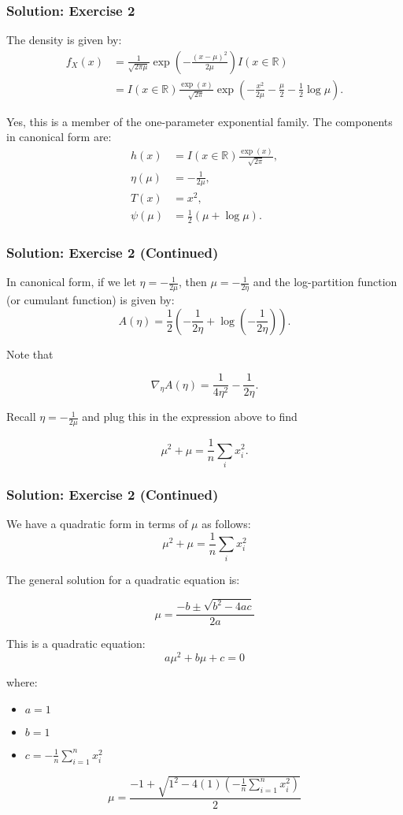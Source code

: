 \documentclass{beamer}
\begin{document}
\begin{frame}
\frametitle{Solution: Exercise 2}
The density is given by:
\[
\begin{aligned}
f_X(x) &= \frac{1}{\sqrt{2\pi\mu}} \exp\left(-\frac{(x - \mu)^2}{2\mu} \right) I(x \in \mathbb{R})\\[1mm]
&= I(x \in \mathbb{R}) \frac{\exp(x)}{\sqrt{2\pi}} \exp\left(-\frac{x^2}{2\mu} - \frac{\mu}{2} - \frac{1}{2}\log \mu \right).
\end{aligned}
\]

Yes, this is a member of the one-parameter exponential family. The components in canonical form are:
\[
\begin{aligned}
h(x) &= I(x \in \mathbb{R})\frac{\exp(x)}{\sqrt{2\pi}},\\[1mm]
\eta(\mu) &= -\frac{1}{2\mu},\\[1mm]
T(x) &= x^2,\\[1mm]
\psi(\mu) &= \frac{1}{2}\left(\mu + \log \mu\right).
\end{aligned}
\]

\end{frame}

\begin{frame}
\frametitle{Solution: Exercise 2 (Continued)}
In canonical form, if we let \(\eta = -\frac{1}{2\mu}\), then \(\mu = -\frac{1}{2\eta}\) and the log-partition function (or cumulant function) is given by:
\[
A(\eta) = \frac{1}{2}\left(-\frac{1}{2\eta} + \log\left(-\frac{1}{2\eta}\right)\right).
\]

Note that 

$$
\nabla_{\eta} A(\eta) = \frac{1}{4 \eta^2} - \frac{1}{2 \eta}.
$$

Recall \(\eta = -\frac{1}{2\mu}\) and plug this in the expression above to find

$$\mu^2 + \mu = \frac{1}{n} \sum_i x_i^2.$$

\end{frame}

\begin{frame}
\frametitle{Solution: Exercise 2 (Continued)}

We have a quadratic form in terms of $\mu$ as follows:
$$\mu^2 + \mu = \frac{1}{n} \sum_i x_i^2$$

The general solution for a quadratic equation is:

\[
\mu = \frac{-b \pm \sqrt{b^2 - 4ac}}{2a}
\]

This is a quadratic equation:
\[
a\mu^2 + b\mu + c = 0
\]

where:
\begin{itemize}
    \item \( a = 1 \)
    \item \( b = 1 \)
    \item \( c = -\frac{1}{n} \sum_{i=1}^{n} x_i^2 \)
\end{itemize}



\[
\mu = \frac{-1 + \sqrt{1^2 - 4 \left(1\right) \left(-\frac{1}{n} \sum_{i=1}^{n} x_i^2\right)}}{2}
\]

\end{frame}
\end{document}
